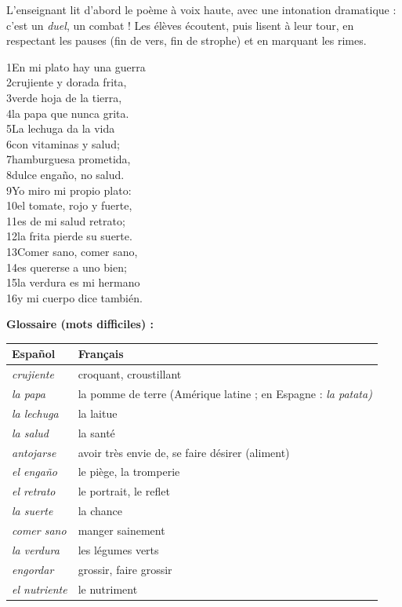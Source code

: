 \documentclass[11pt]{article}
\newcommand{\esp}[1]{\ifmmode\text{\textit{#1}}\else\begingroup\selectlanguage{spanish}\itshape #1\endgroup\fi}
\begin{document}
L'enseignant lit d'abord le poème à voix haute, avec une intonation dramatique : c'est un \emph{duel}, un combat ! Les élèves écoutent, puis lisent à leur tour, en respectant les pauses (fin de vers, fin de strophe) et en marquant les rimes.

\begin{textebox}
1\quad En mi plato hay una guerra\\
2\quad crujiente y dorada frita,\\
3\quad verde hoja de la tierra,\\
4\quad la papa que nunca grita.\\[6pt]
5\quad La lechuga da la vida\\
6\quad con vitaminas y salud;\\
7\quad hamburguesa prometida,\\
8\quad dulce engaño, no salud.\\[6pt]
9\quad Yo miro mi propio plato:\\
10\quad el tomate, rojo y fuerte,\\
11\quad es de mi salud retrato;\\
12\quad la frita pierde su suerte.\\[6pt]
13\quad Comer sano, comer sano,\\
14\quad es quererse a uno bien;\\
15\quad la verdura es mi hermano\\
16\quad y mi cuerpo dice también.
\end{textebox}

\textbf{Glossaire (mots difficiles) :}

\begin{center}
\begin{tabularx}{\linewidth}{|X|X|}\hline
\rowcolor{popblueL} \textbf{Español} & \textbf{Français} \\ \hline
\esp{crujiente} & croquant, croustillant \\ \hline
\esp{la papa} & la pomme de terre (Amérique latine ; en Espagne : \esp{la patata}) \\ \hline
\esp{la lechuga} & la laitue \\ \hline
\esp{la salud} & la santé \\ \hline
\esp{antojarse} & avoir très envie de, se faire désirer (aliment) \\ \hline
\esp{el engaño} & le piège, la tromperie \\ \hline
\esp{el retrato} & le portrait, le reflet \\ \hline
\esp{la suerte} & la chance \\ \hline
\esp{comer sano} & manger sainement \\ \hline
\esp{la verdura} & les légumes verts \\ \hline
\esp{engordar} & grossir, faire grossir \\ \hline
\esp{el nutriente} & le nutriment \\ \hline
\end{tabularx}
\end{center}
\end{document}
